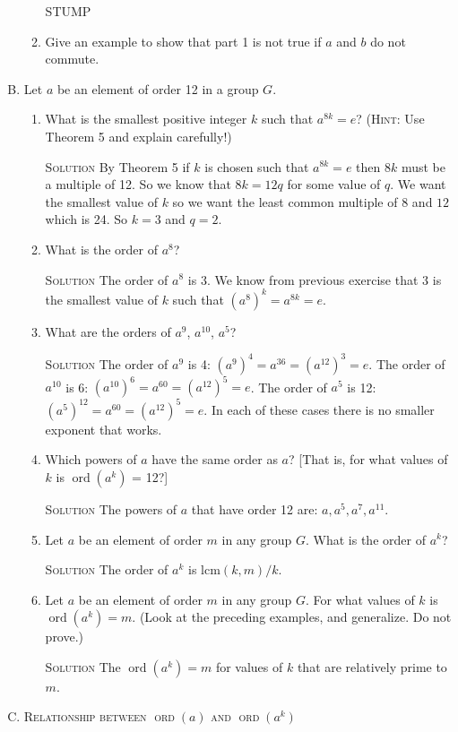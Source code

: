 \documentclass[twoside]{amsart}
\newcommand{\solution}{\textsc{Solution}\xspace}
\newcommand{\blank}{\vspace{5pt}}
\newcommand{\itm}{\blank\item}
\newcommand{\sol}{\blank\noindent\solution}
\newcommand{\ord}{\mathop{\mathrm{ord}}}
\begin{document}
\begin{enumerate}[A.]
\begin{enumerate}[1]
      STUMP

      \itm Give an example to show that part 1 is not true if $a$ and $b$
      do not commute.

   \end{enumerate}

   \itm Let $a$ be an element of order 12 in a group $G$.

   \begin{enumerate}[1]
      \itm What is the smallest positive integer $k$ such that $a^{8k} = e$?
      (\textsc{Hint}: Use Theorem 5 and explain carefully!)

      \sol By Theorem 5 if $k$ is chosen such that $a^{8k} = e$ then 
      $8k$ must be a multiple of 12. So we know that $8k = 12q$
      for some value of $q$. We want the smallest value of $k$ so we want
      the least common multiple of $8$ and $12$ which is 24. So $k = 3$
      and $q=2$. 

      \itm What is the order of $a^8$?

      \sol The order of $a^8$ is 3. We know from previous exercise that 3
      is the smallest value of $k$ such that $(a^8)^k = a^{8k} = e$. 

      \itm What are the orders of $a^9$, $a^{10}$, $a^5$?

      \sol The order of $a^9$ is 4: $(a^9)^4 = a^{36} = (a^{12})^3 = e$.
      The order of $a^{10}$ is 6: $(a^{10})^6 = a^{60} = (a^{12})^5 = e$.
      The order of $a^5$ is 12: $(a^5)^{12} = a^{60} = (a^{12})^5 = e$.
      In each of these cases there is no smaller exponent that works.

      \itm Which powers of $a$ have the same order as $a$? [That is, for
      what values of $k$ is $\ord(a^k)$ = 12?]

      \sol The powers of $a$ that have order 12 are: $a, a^5, a^7, a^{11}$.

      \itm Let $a$ be an element of order $m$ in any group $G$. What 
      is the order of $a^k$?

      \sol The order of $a^k$ is $\mathrm{lcm}(k,m)/k$.

      \itm Let $a$ be an element of order $m$ in any group $G$. For what
      values of $k$ is $\ord(a^k)=m$. (Look at the preceding examples,
      and generalize. Do not prove.)

      \sol The $\ord(a^k)=m$ for values of $k$ that are relatively prime
      to $m$.
   \end{enumerate}

   \itm \textsc{Relationship between $\ord(a)$ and $\ord(a^k)$}


\end{enumerate}
\end{document}
